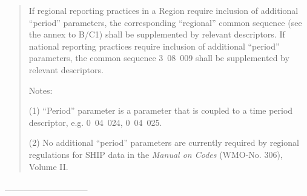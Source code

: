\begin{quote}
If regional reporting practices in a Region require inclusion of additional ``period'' parameters, the corresponding ``regional'' common sequence (see the annex to B/C1) shall be supplemented by relevant descriptors. If national reporting practices require inclusion of additional ``period'' parameters, the common sequence 3~08~009 shall be supplemented by relevant descriptors.

Notes:

(1) ``Period'' parameter is a parameter that is coupled to a time period descriptor, e.g. 0~04~024, 0~04~025.

(2) No additional ``period'' parameters are currently required by regional regulations for SHIP data in the \emph{Manual on Codes} (WMO-No. 306), Volume II.
\end{quote}

\_\_\_\_\_\_\_\_\_\_\_\_\_
